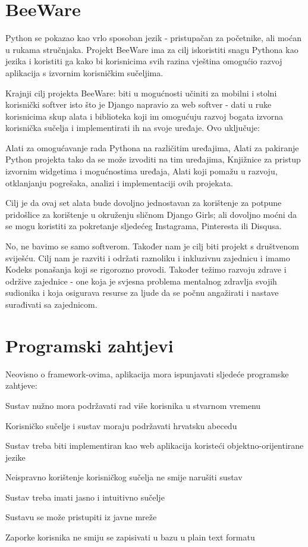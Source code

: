 	\bigskip

	\section{BeeWare}

	Python se pokazao kao vrlo sposoban jezik - pristupačan za početnike, ali moćan u rukama stručnjaka. Projekt BeeWare ima za cilj iskoristiti snagu Pythona kao jezika i koristiti ga kako bi korisnicima svih razina vještina omogućio razvoj aplikacija s izvornim korisničkim sučeljima.

	Krajnji cilj projekta BeeWare: biti u mogućnosti učiniti za mobilni i stolni korisnički softver isto što je Django napravio za web softver - dati u ruke korisnicima skup alata i biblioteka koji im omogućuju razvoj bogata izvorna korisnička sučelja i implementirati ih na svoje uređaje. Ovo uključuje:

	Alati za omogućavanje rada Pythona na različitim uređajima,
	Alati za pakiranje Python projekta tako da se može izvoditi na tim uređajima,
	Knjižnice za pristup izvornim widgetima i mogućnostima uređaja,
	Alati koji pomažu u razvoju, otklanjanju pogrešaka, analizi i implementaciji ovih projekata.

	Cilj je da ovaj set alata bude dovoljno jednostavan za korištenje za potpune pridošlice za korištenje u okruženju sličnom Django Girls; ali dovoljno moćni da se mogu koristiti za pokretanje sljedećeg Instagrama, Pinteresta ili Disqusa.

	No, ne bavimo se samo softverom. Također nam je cilj biti projekt s društvenom sviješću. Cilj nam je razviti i održati raznoliku i inkluzivnu zajednicu i imamo Kodeks ponašanja koji se rigorozno provodi. Također težimo razvoju zdrave i održive zajednice - one koja je svjesna problema mentalnog zdravlja svojih sudionika i koja osigurava resurse za ljude da se počnu angažirati i nastave surađivati sa zajednicom.

	\bigskip

	\section{Programski zahtjevi}
	Neovisno o framework-ovima, aplikacija mora ispunjavati sljedeće programske zahtjeve:

		\begin{packed_item}

			\item Sustav nužno mora podržavati rad više korisnika u stvarnom vremenu
			\item Korisničko sučelje i sustav moraju podržavati hrvatsku abecedu
			\item Sustav treba biti implementiran kao web aplikacija koristeći objektno-orijentirane jezike
			\item Neispravno korištenje korisničkog sučelja ne smije narušiti sustav
			\item Sustav treba imati jasno i intuitivno sučelje
			\item Sustavu se može pristupiti iz javne mreže
			\item Zaporke korisnika ne smiju se zapisivati u bazu u plain text formatu

		\end{packed_item}
